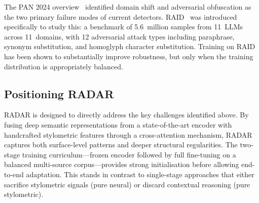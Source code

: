 The PAN 2024 overview~\cite{bevendorff:2024d} identified domain shift and adversarial
obfuscation as the two primary failure modes of current detectors. RAID~\cite{dugan:2024}
was introduced specifically to study this: a benchmark of 5.6~million samples from 11~LLMs
across 11~domains, with 12 adversarial attack types including paraphrase, synonym substitution,
and homoglyph character substitution. Training on RAID has been shown to substantially
improve robustness, but only when the training distribution is appropriately balanced.

\subsection{Positioning RADAR}

RADAR is designed to directly address the key challenges identified above. By fusing
deep semantic representations from a state-of-the-art encoder with handcrafted
stylometric features through a cross-attention mechanism, RADAR captures both
surface-level patterns and deeper structural regularities. The two-stage training
curriculum—frozen encoder followed by full fine-tuning on a balanced multi-source
corpus—provides strong initialisation before allowing end-to-end adaptation. This
stands in contrast to single-stage approaches that either sacrifice stylometric
signals (pure neural) or discard contextual reasoning (pure stylometric).
